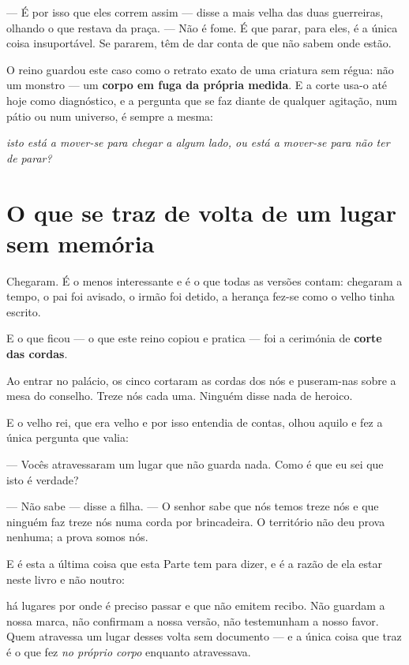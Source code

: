\documentclass[livro.tex]{subfiles}
\begin{document}
\medskip

--- É por isso que eles correm assim --- disse a mais velha das duas guerreiras, olhando o
que restava da praça. --- Não é fome. É que parar, para eles, é a única coisa
insuportável. Se pararem, têm de dar conta de que não sabem onde estão.

\medskip

O reino guardou este caso como o retrato exato de uma criatura sem régua: não um monstro
--- um \textbf{corpo em fuga da própria medida}. E a corte usa-o até hoje como
diagnóstico, e a pergunta que se faz diante de qualquer agitação, num pátio ou num
universo, é sempre a mesma:

\emph{isto está a mover-se para chegar a algum lado, ou está a mover-se para não ter de
parar?}

\section{O que se traz de volta de um lugar sem memória}

Chegaram. É o menos interessante e é o que todas as versões contam: chegaram a tempo, o
pai foi avisado, o irmão foi detido, a herança fez-se como o velho tinha escrito.

E o que ficou --- o que este reino copiou e pratica --- foi a cerimónia de \textbf{corte
das cordas}.

\medskip

Ao entrar no palácio, os cinco cortaram as cordas dos nós e puseram-nas sobre a mesa do
conselho. Treze nós cada uma. Ninguém disse nada de heroico.

E o velho rei, que era velho e por isso entendia de contas, olhou aquilo e fez a única
pergunta que valia:

--- Vocês atravessaram um lugar que não guarda nada. Como é que eu sei que isto é
verdade?

--- Não sabe --- disse a filha. --- O senhor sabe que nós temos treze nós e que ninguém
faz treze nós numa corda por brincadeira. O território não deu prova nenhuma; a prova
somos nós.

\medskip

E é esta a última coisa que esta Parte tem para dizer, e é a razão de ela estar neste
livro e não noutro:

há lugares por onde é preciso passar e que não emitem recibo. Não guardam a nossa marca,
não confirmam a nossa versão, não testemunham a nosso favor. Quem atravessa um lugar
desses volta sem documento --- e a única coisa que traz é o que fez \emph{no próprio
corpo} enquanto atravessava.
\end{document}
